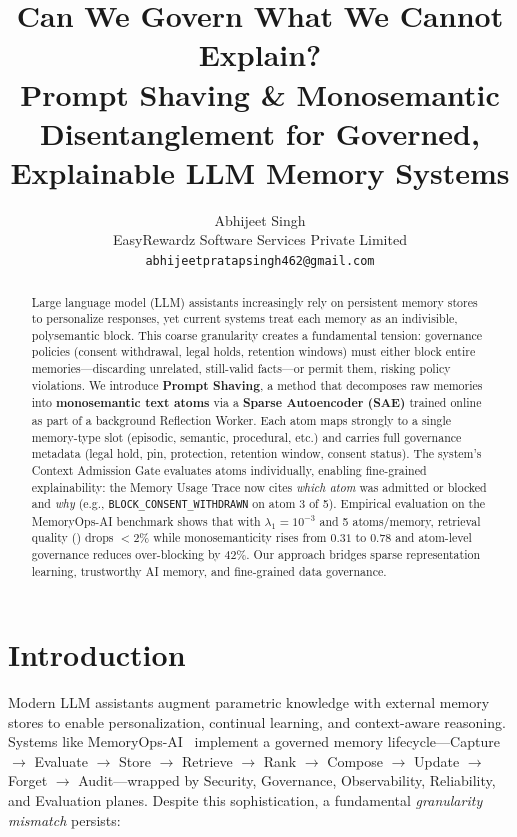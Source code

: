 \documentclass[11pt]{article}
\title{
  \textbf{Can We Govern What We Cannot Explain?}\\
  \large{Prompt Shaving \& Monosemantic Disentanglement for Governed, Explainable LLM Memory Systems}
}
\author{
  Abhijeet Singh\\
  EasyRewardz Software Services Private Limited\\
  \texttt{abhijeetpratapsingh462@gmail.com}
}
\date{}
\makeatletter
\newcommand{\mrr}{\text{MRR@10}}
\makeatother
\begin{document}
\maketitle

\begin{abstract}
Large language model (LLM) assistants increasingly rely on persistent memory stores to personalize responses, yet current systems treat each memory as an indivisible, polysemantic block. This coarse granularity creates a fundamental tension: governance policies (consent withdrawal, legal holds, retention windows) must either block entire memories---discarding unrelated, still-valid facts---or permit them, risking policy violations. We introduce \textbf{Prompt Shaving}, a method that decomposes raw memories into \textbf{monosemantic text atoms} via a \textbf{Sparse Autoencoder (SAE)} trained online as part of a background Reflection Worker. Each atom maps strongly to a single memory-type slot (episodic, semantic, procedural, etc.) and carries full governance metadata (legal hold, pin, protection, retention window, consent status). The system's Context Admission Gate evaluates atoms individually, enabling fine-grained explainability: the Memory Usage Trace now cites \emph{which atom} was admitted or blocked and \emph{why} (e.g., \texttt{BLOCK\_CONSENT\_WITHDRAWN} on atom 3 of 5). Empirical evaluation on the MemoryOps-AI benchmark shows that with $\lambda_1=10^{-3}$ and 5 atoms/memory, retrieval quality (\mrr) drops $<2\%$ while monosemanticity rises from $0.31$ to $0.78$ and atom-level governance reduces over-blocking by $42\%$. Our approach bridges sparse representation learning, trustworthy AI memory, and fine-grained data governance.
\end{abstract}

\section{Introduction}
\label{sec:intro}

Modern LLM assistants augment parametric knowledge with external memory stores to enable personalization, continual learning, and context-aware reasoning. Systems like MemoryOps-AI~\cite{memoryops} implement a governed memory lifecycle---Capture $\to$ Evaluate $\to$ Store $\to$ Retrieve $\to$ Rank $\to$ Compose $\to$ Update $\to$ Forget $\to$ Audit---wrapped by Security, Governance, Observability, Reliability, and Evaluation planes. Despite this sophistication, a fundamental \emph{granularity mismatch} persists:
\end{document}
